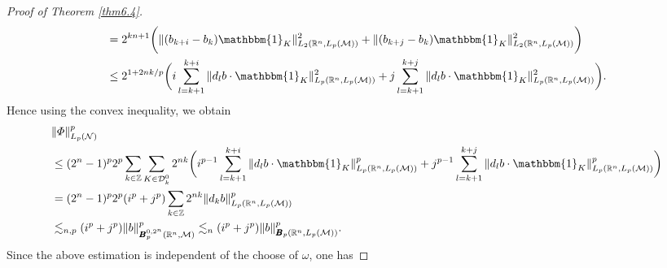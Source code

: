 \documentclass[oneside,english,a4wide]{amsart}
\numberwithin{equation}{section}
\numberwithin{figure}{section}
\theoremstyle{plain}
\theoremstyle{plain}
\theoremstyle{definition}
\theoremstyle{plain}
\theoremstyle{remark}
\theoremstyle{definition}
\theoremstyle{remark}
\theoremstyle{definition}
\newcommand{\8}{\infty}
\begin{document}
\begin{proof}[Proof of Theorem \ref{thm6.4}]
\begin{equation}
\begin{aligned}
			&= 2^{kn+1}\bigg(\|(b_{k+i}-b_{k})\mathbbm{1}_K\|_{L_2(\mathbb{R}^n,L_p(\mathcal{M}))}^2+\|(b_{k+j}-b_{k})\mathbbm{1}_K\|_{L_2(\mathbb{R}^n,L_p(\mathcal{M}))}^2\bigg)\\
			&\le 
			2^{1+2nk/p}\biggl(i\sum_{l=k+1}^{k+i}\|d_lb\cdot \mathbbm{1}_K\|_{L_p(\mathbb{R}^n,L_p(\mathcal{M}))}^2+j\sum_{l=k+1}^{k+j}\|d_l b\cdot \mathbbm{1}_K\|_{L_p(\mathbb{R}^n,L_p(\mathcal{M}))}^2\biggr).
		\end{aligned}
	\end{equation}
	Hence using the convex inequality, we obtain
	\begin{equation*}
		\begin{aligned}
			{}&\|\varPhi\|_{L_p(\mathcal{N})}^p\\
			&\le (2^n-1)^p2^{p}\sum_{k\in\mathbb{Z}}\sum_{K\in\mathcal{D}^0_k}2^{nk}\biggl(i^{p-1}\sum_{l=k+1}^{k+i}\|d_lb\cdot\mathbbm{1}_K\|_{L_p(\mathbb{R}^n,L_p(\mathcal{M}))}^p+j^{p-1}\sum_{l=k+1}^{k+j}\|d_lb\cdot\mathbbm{1}_K\|_{L_p(\mathbb{R}^n,L_p(\mathcal{M}))}^p\biggr)\\
			&=(2^n-1)^p2^{p}(i^{p}+j^{p})\sum_{k\in\mathbb{Z}}2^{nk}\|d_kb\|_{L_p(\mathbb{R}^n,L_p(\mathcal{M}))}^p\\
			&\lesssim_{n,p}(i^{p}+j^{p})\|b\|_{\pmb{B}_p^{0, 2^n}(\mathbb{R}^n,\mathcal{M})}^p\lesssim_{n} (i^{p}+j^{p})\|b\|_{\pmb{B}_p(\mathbb{R}^n,L_p(\mathcal{M}))}^p.
		\end{aligned}
	\end{equation*}
	Since the above estimation is independent of the choose of $\omega$, one has

\end{proof}
\end{document}
